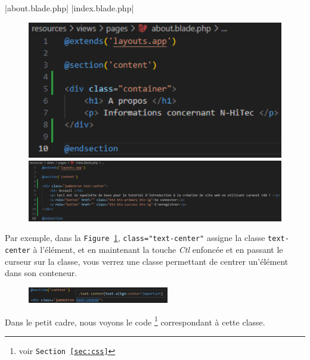 |about.blade.php|
|index.blade.php|
\begin{figure}[!ht]
    \centering
    \begin{minipage}{0.28\textwidth}
         \centering
         \includegraphics[width=\textwidth]{figures-C1/about_bs.pdf}
         \caption{\\\hspace{\textwidth} \protect{}\label{fig:about_bs}}
    \end{minipage}
    \begin{minipage}{0.7\textwidth}
         \centering
         \includegraphics[width=\textwidth]{figures-C1/index_bs.pdf}
         \caption{\protect{}\label{fig:index_bs}}
    \end{minipage}
\end{figure}

Par exemple, dans la \texttt{Figure~\ref{fig:index_bs}}, \verb|class="text-center"| assigne la classe \verb|text-center| à l'élément, et en maintenant la touche \textit{Ctl} enfoncée et en passant le curseur sur la classe, vous verrez une classe permettant de centrer un'élément dans son conteneur.

\begin{figure}
    \vspace{-0.5cm}
    \includegraphics[width=0.55\textwidth]{figures-C1/see_class.pdf}
\end{figure}
Dans le petit cadre, nous voyons le code \css{}\footnote{voir \texttt{Section~\ref{sec:css}}} correspondant à cette classe.

